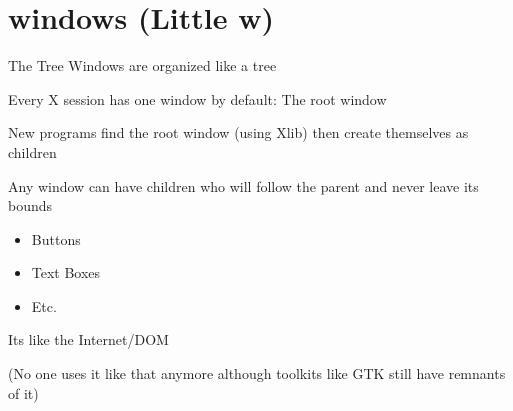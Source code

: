 \documentclass[10pt]{beamer}
\begin{document}
\section{windows (Little w)}

\begin{frame}{The Tree}
  Windows are organized like a tree
  \pause

  Every X session has one window by default: The root window
  \pause

  New programs find the root window (using Xlib) then create themselves as
  children
  \pause

  Any window can have children who will follow the parent and never leave its
  bounds
  \pause

  \begin{itemize}
    \item Buttons
    \item Text Boxes
    \item Etc.
  \end{itemize}

  \pause
  Its like the Internet/DOM

  \pause
  (No one uses it like that anymore although toolkits like GTK still have
  remnants of it)
\end{frame}
\end{document}
